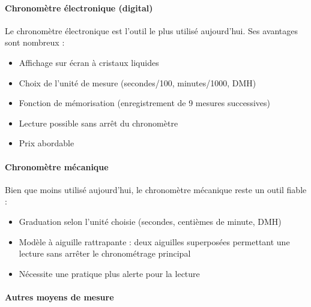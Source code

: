 \documentclass[a4paper,12pt]{article}
\begin{document}
\begin{center}
\end{center}

\paragraph{Chronomètre électronique (digital)}

Le chronomètre électronique est l'outil le plus utilisé aujourd'hui. Ses avantages sont nombreux :

\begin{itemize}
    \item Affichage sur écran à cristaux liquides
    \item Choix de l'unité de mesure (secondes/100, minutes/1000, DMH)
    \item Fonction de mémorisation (enregistrement de 9 mesures successives)
    \item Lecture possible sans arrêt du chronomètre
    \item Prix abordable
\end{itemize}

\paragraph{Chronomètre mécanique}

Bien que moins utilisé aujourd'hui, le chronomètre mécanique reste un outil fiable :

\begin{itemize}
    \item Graduation selon l'unité choisie (secondes, centièmes de minute, DMH)
    \item Modèle à aiguille rattrapante : deux aiguilles superposées permettant une lecture sans arrêter le chronométrage principal
    \item Nécessite une pratique plus alerte pour la lecture
\end{itemize}

\paragraph{Autres moyens de mesure}
\end{document}
